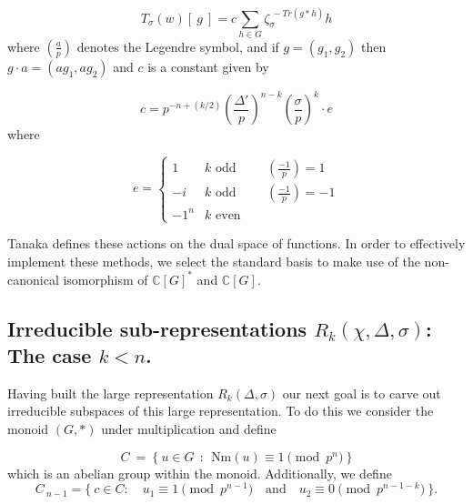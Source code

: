 \documentclass[12pt,reqno]{amsart}
\theoremstyle{remark}
\numberwithin{table}{section}
\newcommand{\C}{\mathbb C}
\begin{document}
\begin{equation}\label{eq:w}T_\sigma(w) \left [ \: g \:  \right ] =  c \displaystyle \sum_{h \in G} \zeta_{\sigma}^{\: -Tr(g *\overline{h})}  h  \end{equation}
where  $\left ( \frac{a}{p} \right )$ denotes the Legendre symbol, and if $g = (g_1,g_2)$ then $g \cdot a =(ag_1,ag_2)$ and $c$ is a constant 
given by 


\[ c = p^{-n +(k/2)} \left ( \frac{\Delta'}{p} \right )^{n -k} \left ( \frac{\sigma}{p} \right )^{k} \cdot e \]
where 

\[e = 
\begin{cases} 1 & k \text{ odd} \hspace{1cm} \left ( \frac{-1}{p} \right ) = 1 \\
-i & k \text{ odd} \hspace{1cm} \left ( \frac{-1}{p} \right ) = -1 \\
-1^n & k  \text{ even} \end{cases}  \]

Tanaka \cite{Tanaka67-2} defines these actions on the dual space of functions. In order  to effectively implement these methods, we select the standard basis to make use of the non-canonical isomorphism of $\C[G]^*$ and $\C[G]$.

\subsection{Irreducible sub-representations $R_k(\chi, \Delta, \sigma)$: The case $k<n$.}

Having built the large representation 
$R_k(\Delta, \sigma)$ our next goal is to carve out irreducible subspaces of this large representation. To do this we consider the monoid $(G, *)$ under multiplication %
 and define

\begin{equation}
C \: = \: \{ \: u \in G \: \: : \: \:  \text{Nm}(u) \equiv 1 \pmod{p^n} \:  \} 
\end{equation}\label{eq:Cdef}
which is an abelian group within the monoid. Additionally, we define
\[ C_{\: n-1}  =  \{ \: c \in C  :  \quad u_1 \equiv 1  \pmod{p^{n-1}} \quad \text{and} \quad u_2 \equiv 0   \pmod{p^{n-1-k}} \: \}. \]

\end{document}
